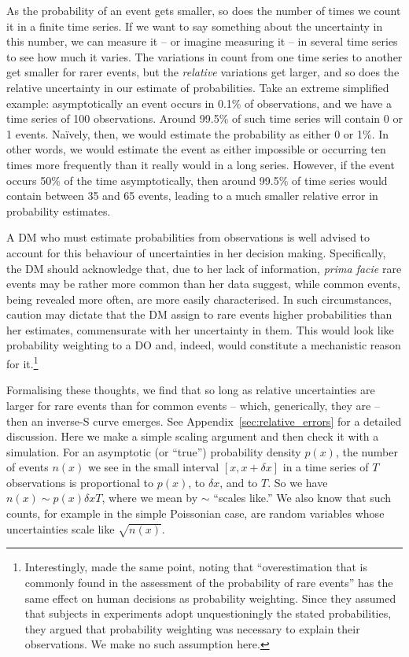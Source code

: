 \documentclass[12pt,letter,timesnewroman]{article}
\newcommand{\Appref}[1]{Appendix~\ref{sec:#1}}
\begin{document}
As the probability of an event gets smaller, so does the number of times we count it in a finite time series. If we want to say something about the uncertainty in this number, we can measure it -- or imagine measuring it -- in several time series to see how much it varies. The variations in count from one time series to another get smaller for rarer events, but the \textit{relative} variations get larger, and so does the relative uncertainty in our estimate of probabilities. Take an extreme simplified example: asymptotically an event occurs in 0.1\% of observations, and we have a time series of 100 observations.
Around 99.5\% of such time series will contain 0 or 1 events. Na\"{i}vely, then, we would estimate the probability as either 0 or 1\%. In other words, we would estimate the event as either impossible or occurring ten times more frequently than it really would in a long series. However, if the event occurs 50\% of the time asymptotically, then around 99.5\% of time series would contain between 35 and 65 events, leading to a much smaller relative error in probability estimates.

A DM who must estimate probabilities from observations is well advised to account for this behaviour of uncertainties in her decision making. Specifically, the DM should acknowledge that, due to her lack of information, \textit{prima facie} rare events may be rather more common than her data suggest, while common events, being revealed more often, are more easily characterised. In such circumstances, caution may dictate that the DM assign to rare events higher probabilities than her estimates, commensurate with her uncertainty in them. This would look like probability weighting to a DO and, indeed, would constitute a mechanistic reason for it.\footnote{Interestingly, \textcite[281]{KahnemanTversky1979} made the same point, noting that ``overestimation that is commonly found in the assessment of the probability of rare events'' has the same effect on human decisions as probability weighting. Since they assumed that subjects in experiments adopt unquestioningly the stated probabilities, they argued that probability weighting was necessary to explain their observations. We make no such assumption here.}

Formalising these thoughts, we find that so long as relative uncertainties are larger for rare events than for common events -- which, generically, they are -- then an inverse-S curve emerges. See \Appref{relative_errors} for a detailed discussion. Here we make a simple scaling argument and then check it with a simulation. For an asymptotic (or ``true'') probability density $p(x)$, the number of events $n(x)$ we see in the small interval $[x, x+ \delta x]$ in a time series of $T$ observations is proportional to $p(x)$, to $\delta x$, and to $T$. So we have $n(x) \sim p(x) \delta x T$, where we mean by $\sim$ ``scales like.'' We also know that such counts, for example in the simple Poissonian case, are random variables whose uncertainties scale like $\sqrt{n(x)}$.
\end{document}
